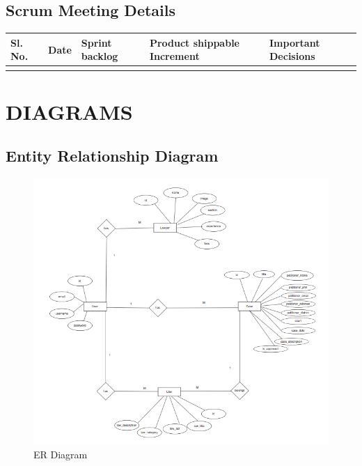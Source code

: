 \section{Scrum Meeting Details}
%
\begin{center}
\begin{tabular}{|m{}|m{}|m{}|m{}|m{}|}
\hline
Sl. No. & Date & Sprint backlog & Product shippable Increment & Important Decisions \\
\hline
& & & &  \\
\hline
\end{tabular}
\end{center}

\renewcommand{\arraystretch}{1}
%
%
\chapter{DIAGRAMS}
\section{Entity Relationship Diagram}
\begin{figure}
  \centering
  \includegraphics[width=1\linewidth]{ERLAW.png}
 \caption{ER Diagram}
   \label{fig:ER-diagram}
\end{figure}
%
%
%
